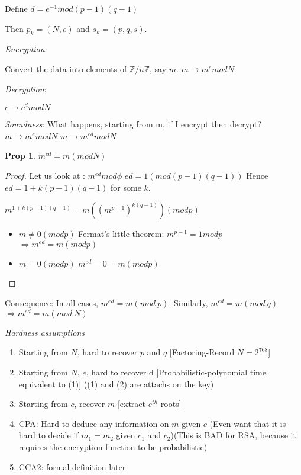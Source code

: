 \documentclass[11pt]{article}
\newtheorem{proposition}{Prop}
\begin{document}
Define $d=e^{-1} mod (p-1)(q-1)$

Then $p_k=(N,e)$ and $s_k=(p,q,s)$.

\textit{Encryption}:

Convert the data into elements of $\mathbb{Z}/ n \mathbb{Z}$, say $m$.
$m \rightarrow m^e mod N$

\textit{Decryption}:

$c \rightarrow c^d mod N$

\textit{Soundness}:
What happens, starting from m, if I encrypt then decrypt?
$m \rightarrow m^e mod N$
$m \rightarrow m^{e d} mod N$

\begin{proposition}
$m^{e d} = m (mod N)$
\end{proposition}

\begin{proof}
Let us look at :
$m^{e d} mod \phi$
$ed = 1 (mod (p-1)(q-1))$
Hence
$ed=1+k(p-1)(q-1)$ for some $k$.

$m^{1+k(p-1)(q-1)}= m ((m^{p-1})^{k(q-1)}) (mod p)$

\begin{itemize}
\item $m \neq 0 (mod p)$
Fermat's little theorem: $m^{p-1}=1 mod p$
$\Rightarrow m^{e d}=m (mod p)$
\item $m=0 (mod p)$
$m^{e d}=0=m (mod p)$
\end{itemize}
\end{proof}

Consequence: In all cases, $m^{e d}= m(mod \ p)$. Similarly, $m^{e d}=m (mod \ q)$
$\Rightarrow m^{e d}=m(mod \ N)$

\textit{Hardness assumptions}

\begin{enumerate}
\item Starting from $N$, hard to recover $p$ and $q$ [Factoring-Record $N = 2^{768}$]
\item Starting from $N$, $e$, hard to recover d [Probabilistic-polynomial time equivalent to (1)] ((1) and (2) are attachs on the key)
\item Starting from $c$, recover $m$ [extract $e^{th}$ roots]
\item CPA: Hard to deduce any information on $m$ given $c$ (Even want that it is hard to decide if $m_1=m_2$ given $c_1$ and $c_2$)(This is BAD for RSA, because it requires the encryption function to be probabilistic)
\item CCA2: formal definition later
\end{enumerate}
\end{document}
